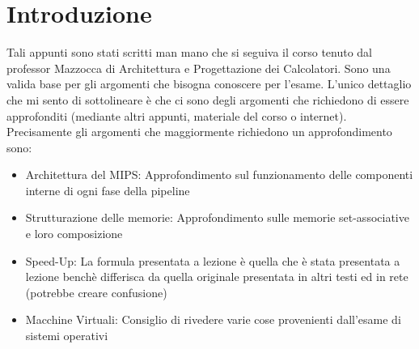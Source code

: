 \chapter*{Introduzione}
Tali appunti sono stati scritti man mano che si seguiva il corso tenuto dal professor Mazzocca di Architettura e Progettazione dei Calcolatori. Sono una valida base per gli argomenti che bisogna conoscere per l'esame. L'unico dettaglio che mi sento di sottolineare è che ci sono degli argomenti che richiedono di essere approfonditi (mediante altri appunti, materiale del corso o internet). Precisamente gli argomenti che maggiormente richiedono un approfondimento sono:
\begin{itemize}
    \item Architettura del MIPS: Approfondimento sul funzionamento delle componenti interne di ogni fase della pipeline
    \item Strutturazione delle memorie: Approfondimento sulle memorie set-associative e loro composizione
    \item Speed-Up: La formula presentata a lezione è quella che è stata presentata a lezione benchè differisca da quella originale presentata in altri testi ed in rete (potrebbe creare confusione)
    \item Macchine Virtuali: Consiglio di rivedere varie cose provenienti dall'esame di sistemi operativi
\end{itemize}

